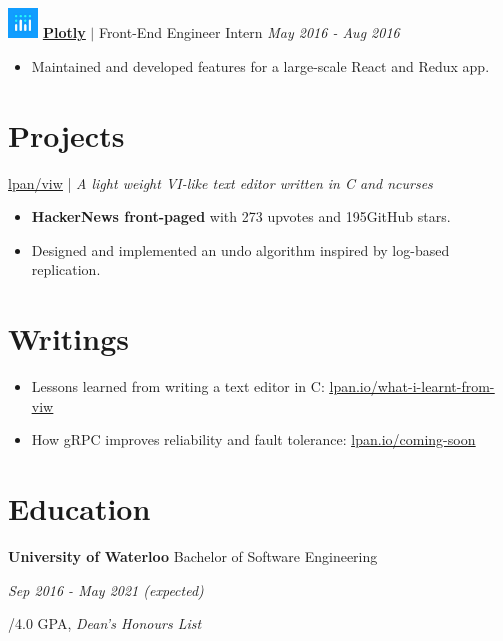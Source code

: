 \documentclass[paper=a4,fontsize=14pt]{scrartcl}
\newcommand{\fullspace}{\vspace*{1em}}
\newcommand{\http}[1]{\href{http://#1}{\ul{#1}}}
\begin{document}
\fullspace
\noindent \includegraphics[width=0.8cm, height=0.8cm]{assets/plotly.png}
\noindent \href{https://plot.ly}{\textbf{\ul{Plotly}}}
$\vert$ Front-End Engineer Intern
{\hfill \textit{May 2016 - Aug 2016}}
\begin{itemize}[noitemsep,leftmargin=17pt,label=\raisebox{0.25ex}{\tiny$\bullet$},topsep=5pt]
  \item Maintained and developed features for a large-scale React and Redux app.
\end{itemize}

\section*{Projects}{}
{
  \noindent \large
  \href{https://github.com/lpan/viw}{\ul{lpan/viw}} | \normalsize \textit{
    A light weight VI-like text editor written in C and ncurses
  }
}
\begin{itemize}[noitemsep,leftmargin=17pt,label=\raisebox{0.25ex}{\tiny$\bullet$},topsep=5pt]
  \item \textbf{HackerNews front-paged}​ with 273​ upvotes and 195​ GitHub stars.
  \item Designed and implemented an undo algorithm inspired by log-based replication​.
\end{itemize}


\section*{Writings}{}
\begin{itemize}[noitemsep,leftmargin=17pt,label=\raisebox{0.25ex}{\tiny$\bullet$},topsep=5pt]
  \item Lessons learned from writing a text editor in C: \http{lpan.io/what-i-learnt-from-viw}
  \item How gRPC improves reliability and fault tolerance: \http{lpan.io/coming-soon}
\end{itemize}

\section*{Education}{}
\noindent \textbf{University of Waterloo} Bachelor of Software Engineering \par
\normalsize
\noindent \textit{Sep 2016 - May 2021 (expected)} \par
{}/4.0 GPA, \textit{Dean's Honours List}
\end{document}
